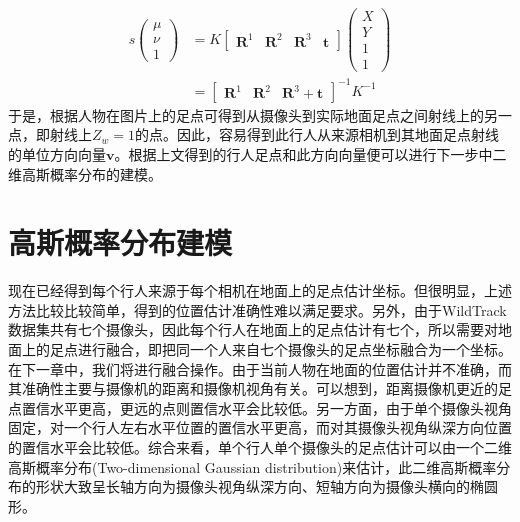 \begin{equation}
  \begin{aligned}
    s\left(
      \begin{matrix}
        \mu \\ \nu \\ 1
      \end{matrix}
    \right)
    &=K\left[
      \begin{matrix}
        \bm{R}^{1}&\bm{R}^{2}&\bm{R}^{3}&\bm{t}
      \end{matrix}
    \right]
    \left(
      \begin{matrix}
        X \\ Y \\ 1 \\ 1
      \end{matrix}
    \right) \\
    &=\left[
      \begin{matrix}
        \bm{R}^{1}&\bm{R}^{2}&\bm{R}^{3}+\bm{t}
      \end{matrix}
    \right]^{-1}K^{-1}
  \end{aligned}
\end{equation}
于是，根据人物在图片上的足点可得到从摄像头到实际地面足点之间射线上的另一点，即射线上$Z_{w}=1$的点。因此，容易得到此行人从来源相机到其地面足点射线的单位方向向量$\bm{v}$。根据上文得到的行人足点和此方向向量便可以进行下一步中二维高斯概率分布的建模。

\section{高斯概率分布建模}

现在已经得到每个行人来源于每个相机在地面上的足点估计坐标。但很明显，上述方法比较比较简单，得到的位置估计准确性难以满足要求。另外，由于WildTrack数据集共有七个摄像头，因此每个行人在地面上的足点估计有七个，所以需要对地面上的足点进行融合，即把同一个人来自七个摄像头的足点坐标融合为一个坐标。在下一章中，我们将进行融合操作。由于当前人物在地面的位置估计并不准确，而其准确性主要与摄像机的距离和摄像机视角有关。可以想到，距离摄像机更近的足点置信水平更高，更远的点则置信水平会比较低。另一方面，由于单个摄像头视角固定，对一个行人左右水平位置的置信水平更高，而对其摄像头视角纵深方向位置的置信水平会比较低。综合来看，单个行人单个摄像头的足点估计可以由一个二维高斯概率分布(Two-dimensional Gaussian distribution)来估计，此二维高斯概率分布的形状大致呈长轴方向为摄像头视角纵深方向、短轴方向为摄像头横向的椭圆形。

